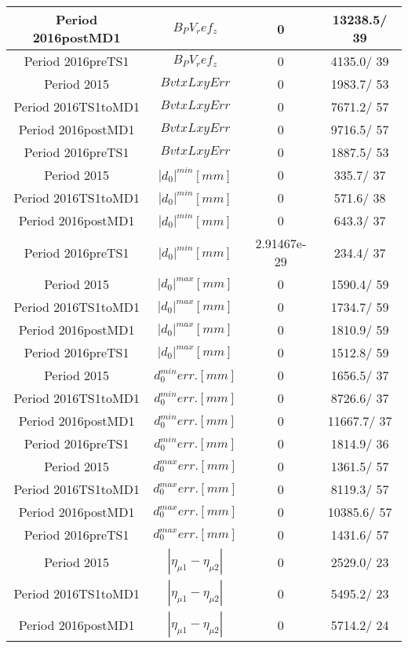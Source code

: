 \documentclass{article}
\begin{document}
\begin{longtable}{c|c|c|c}
\hline
 Period 2016postMD1 & $B_PV_ref_z$ & 0 & 13238.5/ 39\\
\hline
 Period 2016preTS1 & $B_PV_ref_z$ & 0 & 4135.0/ 39\\
\hline
 Period 2015 & $BvtxLxyErr$ & 0 & 1983.7/ 53\\
\hline
 Period 2016TS1toMD1 & $BvtxLxyErr$ & 0 & 7671.2/ 57\\
\hline
 Period 2016postMD1 & $BvtxLxyErr$ & 0 & 9716.5/ 57\\
\hline
 Period 2016preTS1 & $BvtxLxyErr$ & 0 & 1887.5/ 53\\
\hline
 Period 2015 & $|d_{0}|^{min} [mm]$ & 0 & 335.7/ 37\\
\hline
 Period 2016TS1toMD1 & $|d_{0}|^{min} [mm]$ & 0 & 571.6/ 38\\
\hline
 Period 2016postMD1 & $|d_{0}|^{min} [mm]$ & 0 & 643.3/ 37\\
\hline
 Period 2016preTS1 & $|d_{0}|^{min} [mm]$ & 2.91467e-29 & 234.4/ 37\\
\hline
 Period 2015 & $|d_{0}|^{max} [mm]$ & 0 & 1590.4/ 59\\
\hline
 Period 2016TS1toMD1 & $|d_{0}|^{max} [mm]$ & 0 & 1734.7/ 59\\
\hline
 Period 2016postMD1 & $|d_{0}|^{max} [mm]$ & 0 & 1810.9/ 59\\
\hline
 Period 2016preTS1 & $|d_{0}|^{max} [mm]$ & 0 & 1512.8/ 59\\
\hline
 Period 2015 & $d_{0}^{min} err. [mm]$ & 0 & 1656.5/ 37\\
\hline
 Period 2016TS1toMD1 & $d_{0}^{min} err. [mm]$ & 0 & 8726.6/ 37\\
\hline
 Period 2016postMD1 & $d_{0}^{min} err. [mm]$ & 0 & 11667.7/ 37\\
\hline
 Period 2016preTS1 & $d_{0}^{min} err. [mm]$ & 0 & 1814.9/ 36\\
\hline
 Period 2015 & $d_{0}^{max} err. [mm]$ & 0 & 1361.5/ 57\\
\hline
 Period 2016TS1toMD1 & $d_{0}^{max} err. [mm]$ & 0 & 8119.3/ 57\\
\hline
 Period 2016postMD1 & $d_{0}^{max} err. [mm]$ & 0 & 10385.6/ 57\\
\hline
 Period 2016preTS1 & $d_{0}^{max} err. [mm]$ & 0 & 1431.6/ 57\\
\hline
 Period 2015 & $|\eta_{\mu1}-\eta_{\mu2}|$ & 0 & 2529.0/ 23\\
\hline
 Period 2016TS1toMD1 & $|\eta_{\mu1}-\eta_{\mu2}|$ & 0 & 5495.2/ 23\\
\hline
 Period 2016postMD1 & $|\eta_{\mu1}-\eta_{\mu2}|$ & 0 & 5714.2/ 24\\

\end{longtable}
\end{document}
